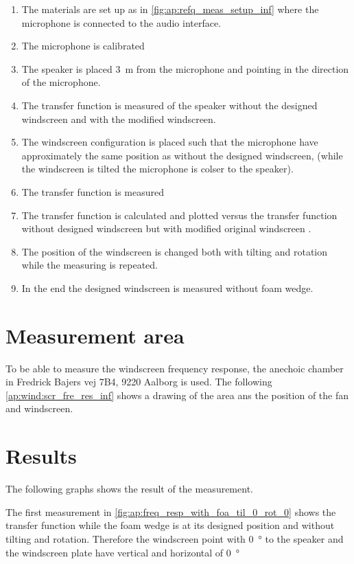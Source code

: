 \begin{enumerate}
\item The materials are set up as in \autoref{fig:ap:refq_meas_setup_inf} where the  microphone is connected to the audio interface.
\item The microphone is calibrated
\item The speaker is placed \SI{3}{\meter} from the microphone and pointing in the direction of the microphone.
\item The transfer function is measured of the speaker without the designed windscreen and with the modified windscreen.
\item	The windscreen configuration is placed such that the microphone have approximately the same position as without the designed windscreen, (while the windscreen is tilted the microphone is colser to the speaker).
\item The transfer function is measured 
\item The transfer function is calculated and plotted versus the transfer function without designed windscreen but with modified original windscreen \matlab.
\item The position of the windscreen is changed both with tilting and rotation while the measuring is repeated.
\item In the end the designed windscreen is measured without foam wedge.
\end{enumerate}


\section*{Measurement area}
To be able to measure the windscreen frequency response, the anechoic chamber in Fredrick Bajers vej 7B4, 9220 Aalborg is used. The following \autoref{ap:wind:scr_fre_res_inf} shows a drawing of the area ans the position of the fan and windscreen.


\section*{Results}

The following graphs shows the result of the measurement. 


The first measurement in \autoref{fig:ap:freq_resp_with_foa_til_0_rot_0} shows the transfer function while the foam wedge is at its designed position and without tilting and rotation. Therefore the windscreen point with \SI{0}{\degree} to the speaker and the windscreen plate have vertical and horizontal of \SI{0}{\degree} 



